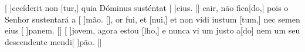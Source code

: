 {    %
    {[ ]{ce}cíderit non [tur,] quia Dóminus susténtat [ ]{e}ius. [\LinkLA]}%
    { cair, não fica[do,] pois o Senhor sustentará a [ ]{mão}. [\LinkPT]},
    {or fui, et [nui,] et non vidi iustum [tum,] nec semen eius [ ]{pa}nem. [\LinkLA]}%
    {[ ]{jo}vem, agora estou [lho,] e nunca vi um justo a[\-do] nem um seu descendente mendi[ ]{pão}. [\LinkPT]}
}